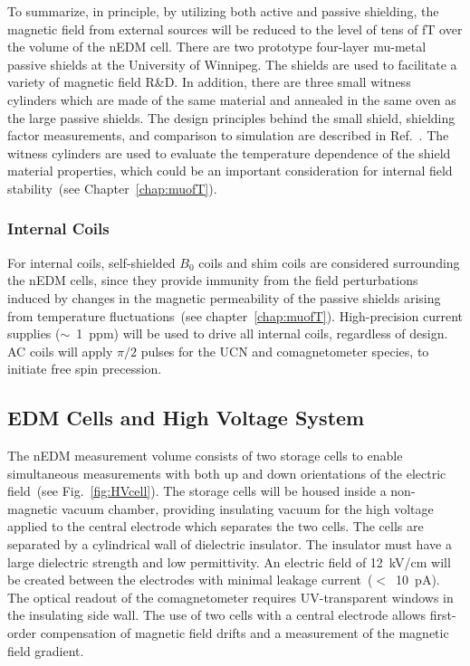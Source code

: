 To summarize, in principle, by utilizing both active and passive
shielding, the magnetic field from external sources will be reduced to
the level of tens of fT over the volume of the nEDM cell. There are
two prototype four-layer mu-metal passive shields at the University of
Winnipeg. The shields are used to facilitate a variety of magnetic
field R\&D. In addition, there are three small witness cylinders which
are made of the same material and annealed in the same oven as the
large passive shields. The design principles behind the small shield,
shielding factor measurements, and comparison to simulation are
described in Ref.~\cite{martin2015large}.  The witness cylinders are
used to evaluate the temperature dependence of the shield material
properties, which could be an important consideration for internal
field stability~(see Chapter~\ref{chap:muofT}).




\subsubsection{Internal Coils}
For internal coils, self-shielded $B_0$ coils and shim coils are
considered surrounding the nEDM cells, since they provide immunity
from the field perturbations induced by changes in the magnetic
permeability of the passive shields arising from temperature
fluctuations~(see chapter~\ref{chap:muofT}).  High-precision current
supplies ($\sim$~1~ppm) will be used to drive all internal coils,
regardless of design. AC coils will apply $\pi/2$ pulses for the UCN
and comagnetometer species, to initiate free spin precession.





\subsection{ EDM Cells and High Voltage System}
The nEDM measurement volume consists of two storage cells to enable
simultaneous measurements with both up and down orientations of the
electric field~(see Fig.~\ref{fig:HVcell}). The storage cells will be
housed inside a non-magnetic vacuum chamber, providing insulating
vacuum for the high voltage applied to the central electrode which
separates the two cells. The cells are separated by a cylindrical
wall of dielectric insulator. The insulator must have a large
dielectric strength and low permittivity. An electric field of
12~kV/cm will be created between the electrodes with minimal leakage
current~($<$~10~pA). The optical readout of the comagnetometer
requires UV-transparent windows in the insulating side wall. The use
of two cells with a central electrode allows first-order compensation
of magnetic field drifts and a measurement of the magnetic field
gradient.

